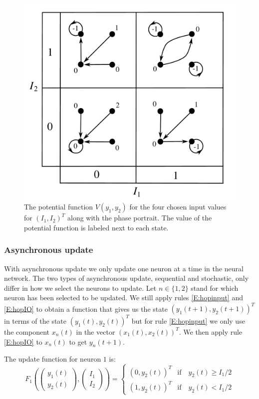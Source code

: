 \begin{figure}[ht]
\centering
\includegraphics[scale=0.40]{./images/discHoppot.pdf}
\caption{The potential function $V(y_1, y_2)$ for the four chosen input 
values for $(I_1,I_2)^T$ along with the phase portrait.  The value of the 
potential function is labeled next to each state.}
\label{F:discHoppot}  
\end{figure}
  
\subsubsection{Asynchronous update}

   With asynchronous update we only update one neuron at a time in the neural 
network.  The two types of asynchronous update, sequential and stochastic,
only differ in how we select the neurons to update.  Let $n \in \{1,2\}$ stand 
for which neuron has been selected to be updated.  We still apply rules 
\eqref{E:hopinput} and \eqref{E:hopIO} to obtain a function that gives us the 
state $(y_1(t+1), y_2(t+1))^T$ in terms of the state $(y_1(t), y_2(t))^T$ but 
for rule \eqref{E:hopinput} we only use the component $x_n(t)$ in the vector 
$(x_1(t), x_2(t))^T$.  We then apply rule \eqref{E:hopIO} to $x_n(t)$ to get 
$y_n(t+1)$.

   The update function for neuron $1$ is:
\begin{equation}\label{E:hopexam1}
F_1
\left(
\begin{pmatrix}
y_1(t) \\ y_2(t)
\end{pmatrix},
\begin{pmatrix}
I_1 \\ I_2
\end{pmatrix}
\right)
=
\left\{
\begin{array}{ll}
(0,y_2(t))^T & \mbox{if} \quad y_2(t) \geq I_1/2 \\
(1,y_2(t))^T & \mbox{if} \quad y_2(t) < I_1/2 
\end{array}\right.
\end{equation}

